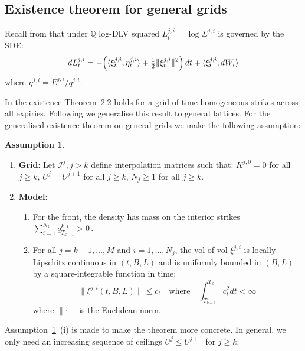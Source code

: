 \documentclass[11pt]{article}
\newcommand{\Q}{\mathbb Q}
\newcommand{\ip}[2]{\langle #1,#2\rangle}
\theoremstyle{plain}
\theoremstyle{definition}
\newtheorem{assumption}[theorem]{Assumption}
\theoremstyle{remark}
\begin{document}
\subsection{Existence theorem for general grids}
Recall from \cite{GROMM2026} that under $\Q$ log-DLV squared $L^{j, i}_t = \log \Sigma^{j, i}$ is governed by the SDE: 
\begin{equation}
  \label{eq:log_dlv_sde}
  dL_t^{j, i} = -\Bigl(\ip{\xi_t^{j,i}}{\eta_t^{j,i}} + \tfrac12\|\xi_t^{j,i}\|^2\Bigr)\,dt + \ip{\xi_t^{j,i}}{dW_t}
\end{equation}
where $\eta^{j,i}=E^{j,i}/q^{j,i}$.


In \cite{GROMM2026} the existence Theorem~2.2 holds for a grid of time-homogeneous strikes across all expiries. Following we generalise this result to general lattices. For the generalised existence theorem on general grids we make the following assumption: 
\begin{assumption}
  \label{assumption:existence_general_grids}
  \begin{enumerate}[label=(\roman*)]
    \item \textbf{Grid}: Let $\mathcal{I}^{j}, j > k$ define interpolation matrices such that: $ K^{j, 0} = 0$ for all $j \geq k$, $ U^{j} = U^{j+1} $ for all $j \geq k $, $N_j \geq 1 $ for all $ j \geq k$. 
  \item \textbf{Model}: 
  \begin{enumerate}[label=(\alph*)]
    \item For the front, the density has mass on the interior strikes $\sum_{i=1}^{N_k} q_{T_{k-1}}^{k, i} > 0 \, .$
  \item For all $j=k+1, \dots, M$ and $i=1, \dots, N_j$, the vol-of-vol $\xi^{j, i}$ is locally Lipschitz continuous in $(t, B, L)$ and is uniformly bounded in $(B, L)$ by a square-integrable function in time: 
  \begin{equation*}
    \|\xi^{j, i}(t, B, L)\| \leq c_t \quad \textrm{where} \quad \int_{T_{k-1}}^{T_k}c_t^2dt<\infty
  \end{equation*}
  where $\|\cdot\|$ is the Euclidean norm.
  \end{enumerate}
  \end{enumerate}
\end{assumption}
Assumption~\ref{assumption:existence_general_grids}~(i) is made to make the theorem more concrete. In general, we only need an increasing sequence of ceilings $U^{j} \leq U^{j+1} $ for $j \geq k$. 
\end{document}
